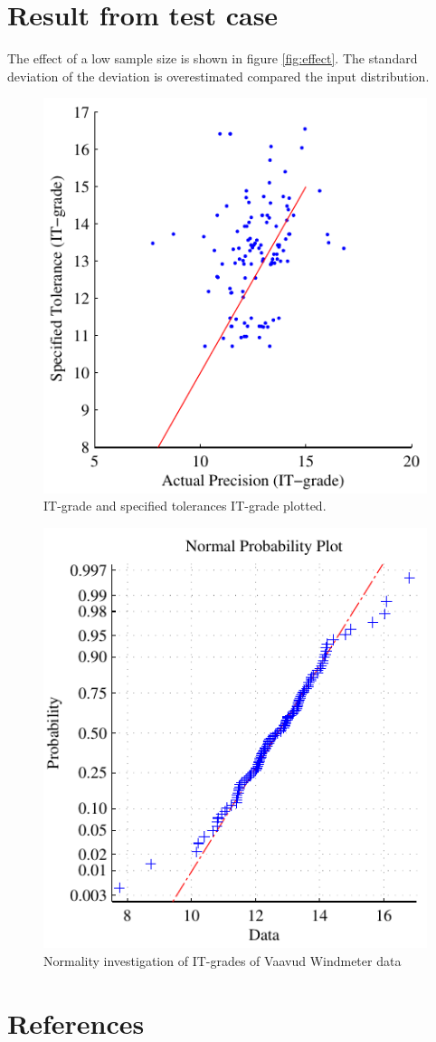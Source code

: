 \documentclass[aip,amsmath, preprint, author-year]{revtex4-1}
\begin{document}
\section{Result from test case}


The effect of a low sample size is shown in figure \ref{fig:effect}. 
The standard deviation of the deviation is overestimated compared the input distribution.

\begin{figure}
\includegraphics{ITG_ITGSpec.pdf}
\caption{\label{fig:ITG_ITGSpec} IT-grade and specified tolerances IT-grade plotted.}
\end{figure}

\begin{figure}
\includegraphics{Normal_plot.pdf}
\caption{\label{fig:normplot} Normality investigation of IT-grades of Vaavud Windmeter data   }
\end{figure}


\section*{References}

\end{document}

